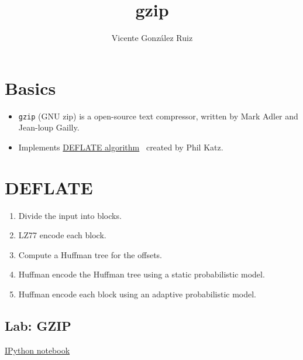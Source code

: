 
\title{gzip}

\author{Vicente González Ruiz}

\maketitle
\section{Basics}
\begin{itemize}
\item
  \texttt{gzip} (GNU zip) is a open-source text compressor, written by
  Mark Adler and Jean-loup Gailly.
\item
  Implements \href{https://en.wikipedia.org/wiki/DEFLATE}{DEFLATE
algorithm}~\cite{deutsch1996deflate, deutsch1996gzip} created by Phil Katz.
\end{itemize}

\section{DEFLATE}
\begin{enumerate}
\def\labelenumi{\arabic{enumi}.}
\tightlist
\item
  Divide the input into blocks.
\item
  LZ77 encode each block.
\item
  Compute a Huffman tree for the offsets.
\item
  Huffman encode the Huffman tree using a static probabilistic model.
\item
  Huffman encode each block using an adaptive probabilistic model.
\end{enumerate}

\subsection{Lab: GZIP}
\href{https://nbviewer.jupyter.org/github/vicente-gonzalez-ruiz/gzip/blob/master/gzip.ipynb}{IPython notebook}


